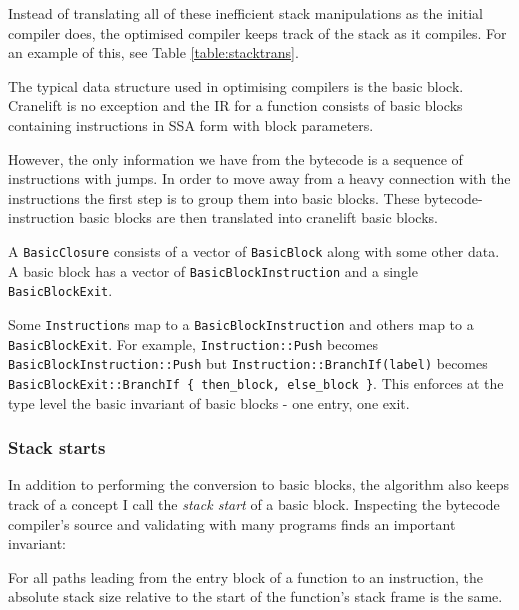 Instead of translating all of these inefficient stack manipulations as the initial compiler does,
the optimised compiler keeps track of the stack as it compiles. For an example of this, see Table
\ref{table:stacktrans}.

\label{opt-bb}

The typical data structure used in optimising compilers is the basic block. Cranelift is no
exception and the IR for a function consists of basic blocks containing instructions in SSA form
with block parameters.

However, the only information we have from the bytecode is a sequence of instructions with jumps.
In order to move away from a heavy connection with the instructions the first step is to group them
into basic blocks. These bytecode-instruction basic blocks are then translated into cranelift basic
blocks.


A \texttt{BasicClosure} consists of a vector of \texttt{BasicBlock} along with
some other data. A basic block has a vector of \texttt{BasicBlockInstruction} and a single
\texttt{BasicBlockExit}.

Some \texttt{Instruction}s map to a \texttt{BasicBlockInstruction} and others map to a
\texttt{BasicBlockExit}. For example, \texttt{Instruction::Push} becomes
\texttt{BasicBlockInstruction::Push} but \texttt{Instruction::BranchIf(label)} becomes
\texttt{BasicBlockExit::BranchIf \{ then\_block, else\_block \}}. This enforces at the type level
the basic invariant of basic blocks - one entry, one exit.

\subsubsection{Stack starts}

In addition to performing the conversion to basic blocks, the algorithm also keeps track of a
concept I call the \emph{stack start} of a basic block. Inspecting the bytecode compiler's source
and validating with many programs finds an important invariant:

\begin{framed}
      \noindent
      For all paths leading from the entry block of a function to an instruction, the absolute
      stack size
      relative to the start of the function's stack frame is the same.
\end{framed}


